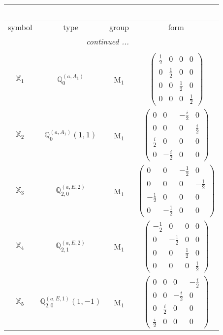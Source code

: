 \documentclass[fleqn,10pt,landscape]{article}
\begin{document}
\begin{itemize}
\begin{center}
\begin{longtable}{c|c|c|c}
\multicolumn{3}{l}{\tablename\ \thetable{}} \\
 \hline \hline
symbol & type & group & form \\ \hline \endhead

 \hline \hline
\multicolumn{3}{r}{\footnotesize\it continued ...} \\ \endfoot

 \hline \hline
\multicolumn{3}{r}{} \\ \endlastfoot

$ \mathbb{X}_{1} $ & $\mathbb{Q}_{0}^{(a,A_{1})}$ & M$_{1}$ & $\begin{pmatrix} \frac{1}{2} & 0 & 0 & 0 \\ 0 & \frac{1}{2} & 0 & 0 \\ 0 & 0 & \frac{1}{2} & 0 \\ 0 & 0 & 0 & \frac{1}{2} \end{pmatrix}$ \\
$ \mathbb{X}_{2} $ & $\mathbb{Q}_{0}^{(a,A_{1})}(1,1)$ & M$_{1}$ & $\begin{pmatrix} 0 & 0 & - \frac{i}{2} & 0 \\ 0 & 0 & 0 & \frac{i}{2} \\ \frac{i}{2} & 0 & 0 & 0 \\ 0 & - \frac{i}{2} & 0 & 0 \end{pmatrix}$ \\
$ \mathbb{X}_{3} $ & $\mathbb{Q}_{2,0}^{(a,E,2)}$ & M$_{1}$ & $\begin{pmatrix} 0 & 0 & - \frac{1}{2} & 0 \\ 0 & 0 & 0 & - \frac{1}{2} \\ - \frac{1}{2} & 0 & 0 & 0 \\ 0 & - \frac{1}{2} & 0 & 0 \end{pmatrix}$ \\
$ \mathbb{X}_{4} $ & $\mathbb{Q}_{2,1}^{(a,E,2)}$ & M$_{1}$ & $\begin{pmatrix} - \frac{1}{2} & 0 & 0 & 0 \\ 0 & - \frac{1}{2} & 0 & 0 \\ 0 & 0 & \frac{1}{2} & 0 \\ 0 & 0 & 0 & \frac{1}{2} \end{pmatrix}$ \\
$ \mathbb{X}_{5} $ & $\mathbb{Q}_{2,0}^{(a,E,1)}(1,-1)$ & M$_{1}$ & $\begin{pmatrix} 0 & 0 & 0 & - \frac{i}{2} \\ 0 & 0 & - \frac{i}{2} & 0 \\ 0 & \frac{i}{2} & 0 & 0 \\ \frac{i}{2} & 0 & 0 & 0 \end{pmatrix}$ \\

\end{longtable}
\end{center}
\end{itemize}
\end{document}
